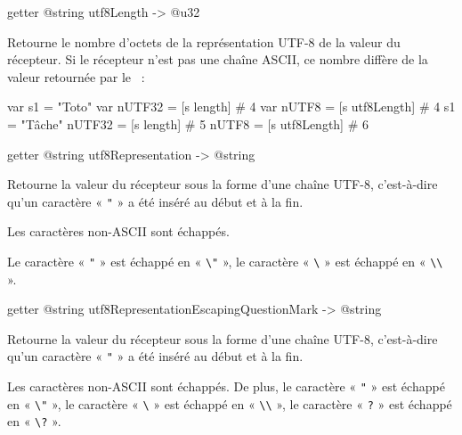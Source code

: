 \begin{galgas4box}
getter @string utf8Length -> @u32
\end{galgas4box}

Retourne le nombre d'octets de la représentation UTF-8 de la valeur du récepteur. Si le récepteur n'est pas une chaîne ASCII, ce nombre diffère de la valeur retournée par le ~:

\begin{galgas4}
 var s1 = "Toto"
 var nUTF32 = [s length] # 4
 var nUTF8  = [s utf8Length] # 4
 s1 = "Tâche"
 nUTF32 = [s length] # 5
 nUTF8  = [s utf8Length] # 6
\end{galgas4}









\begin{galgas4box}
getter @string utf8Representation -> @string
\end{galgas4box}

Retourne la valeur du récepteur sous la forme d'une chaîne UTF-8, c'est-à-dire qu'un caractère « \texttt{"} » a été inséré au début et à la fin.

Les caractères non-ASCII sont échappés.

Le caractère « \texttt{"} » est échappé en « \texttt{\textbackslash"} », le caractère « \texttt{\textbackslash} » est échappé en « \texttt{\textbackslash\textbackslash} ».


















\begin{galgas4box}
getter @string utf8RepresentationEscapingQuestionMark -> @string
\end{galgas4box}

Retourne la valeur du récepteur sous la forme d'une chaîne UTF-8, c'est-à-dire qu'un caractère « \texttt{"} » a été inséré au début et à la fin.

Les caractères non-ASCII sont échappés. De plus, le caractère « \texttt{"} » est échappé en « \texttt{\textbackslash"} », le caractère « \texttt{\textbackslash} » est échappé en « \texttt{\textbackslash\textbackslash} », le caractère « \texttt{?} » est échappé en « \texttt{\textbackslash?} ».









